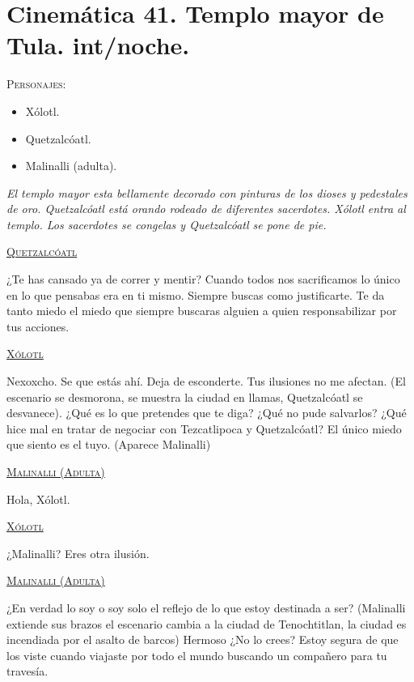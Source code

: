 \documentclass[11pt,letterpaper]{article}
\begin{document}
\section{Cinemática 41. Templo mayor de Tula. int/noche.}
 \textsc{Personajes}:
 \begin{itemize}
 \item Xólotl.
 \item Quetzalcóatl.
 \item Malinalli (adulta).
 \end{itemize}
\textit{El templo mayor esta bellamente decorado con pinturas de los dioses y pedestales de oro. Quetzalcóatl está orando rodeado de diferentes sacerdotes. Xólotl entra al templo. Los sacerdotes se congelas y Quetzalcóatl se pone de pie.}
\begin{center}
\textsc{\underline{Quetzalcóatl}}
\\
\par
¿Te has cansado ya de correr y mentir? Cuando todos nos sacrificamos lo único en lo que pensabas era en ti mismo. Siempre buscas como justificarte. Te da tanto miedo el miedo que siempre buscaras alguien a quien responsabilizar por tus acciones.
\\
\par
\textsc{\underline{Xólotl}}
\\
\par
Nexoxcho. Se que estás ahí. Deja de esconderte. Tus ilusiones no me afectan.
(El escenario se desmorona, se muestra la ciudad en llamas, Quetzalcóatl se desvanece).
¿Qué es lo que pretendes que te diga? ¿Qué no pude salvarlos? ¿Qué hice mal en tratar de negociar con Tezcatlipoca y Quetzalcóatl? El único miedo que siento es el tuyo.
(Aparece Malinalli)
\\
\par
\textsc{\underline{Malinalli (Adulta)}}
\\
\par
Hola, Xólotl.
\\
\par
\textsc{\underline{Xólotl}}
\\
\par
¿Malinalli? Eres otra ilusión.
\\
\par
\textsc{\underline{Malinalli (Adulta)}}
\\
\par
¿En verdad lo soy o soy solo el reflejo de lo que estoy destinada a ser? (Malinalli extiende sus brazos el escenario cambia a la ciudad de Tenochtitlan, la ciudad es incendiada por el asalto de barcos) Hermoso ¿No lo crees? Estoy segura de que los viste cuando viajaste por todo el mundo buscando un compañero para tu travesía.

\end{center}
\end{document}

